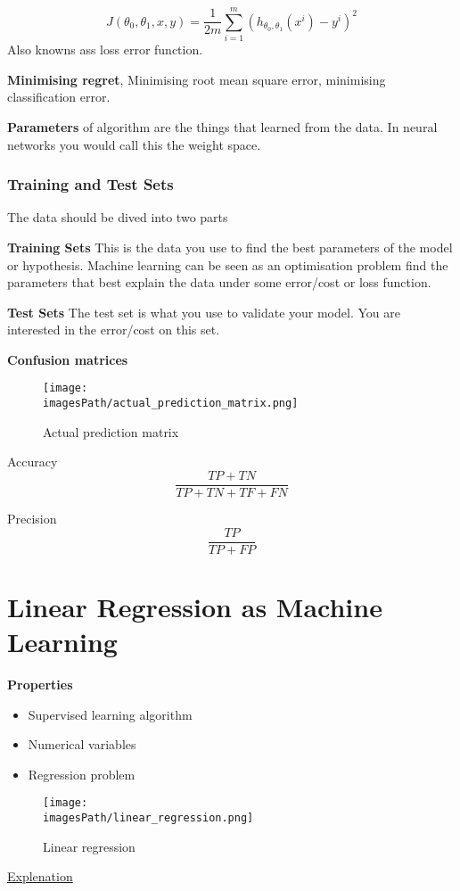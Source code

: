 \documentclass{article}
\newcommand{\imagesPath}{images}
\begin{document}
\begin{equation*}
    J(\theta_0,\theta_1,x,y) = \frac{1}{2m}\sum_{i=1}^{m}(h_{\theta_0,\theta_1}(x^i)-y^i)^2
\end{equation*}
Also knowns ass loss error function.

\textbf{Minimising regret}, Minimising root mean square error, minimising
classification error.

\textbf{Parameters} of algorithm are the things that learned from the data. In
neural networks you would call this the weight space. 

\subsubsection{Training and Test Sets}
The data should be dived into two parts 

\textbf{Training Sets} This is the data you use to find the best parameters of the
model or hypothesis. Machine learning can be seen as an
optimisation problem find the parameters that best explain
the data under some error/cost or loss function.

\textbf{Test Sets} The test set is what you use to validate your model. You are
interested in the error/cost on this set.

\textbf{Confusion matrices}
\begin{figure}[!h]
    \centering
    \texttt{[image: \\imagesPath/actual\_prediction\_matrix.png]}
    \caption{Actual prediction matrix}
\end{figure}

Accuracy 
\begin{equation*}
    \frac{TP+TN}{TP+TN+TF+FN}
\end{equation*}

Precision 
\begin{equation*}
    \frac{TP}{TP+FP}
\end{equation*}

\newpage
\section{Linear Regression as Machine Learning}
\textbf{Properties}
\begin{itemize}
    \item Supervised learning algorithm
    \item Numerical variables 
    \item Regression problem
\end{itemize}
\begin{figure}[!h]
    \centering
    \texttt{[image: \\imagesPath/linear\_regression.png]}
    \caption{Linear regression}
\end{figure}
\href{https://www.youtube.com/watch?v=nk2CQITm_eo}{Explenation}
\end{document}
